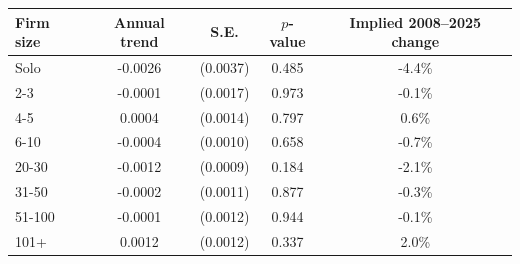 \begin{tabular}{lcccc}
\toprule
    Firm size & Annual trend & S.E. & $p$-value & Implied 2008--2025 change \\
    \midrule
Solo & -0.0026 & (0.0037) & 0.485 & -4.4\% \\
2-3 & -0.0001 & (0.0017) & 0.973 & -0.1\% \\
4-5 & 0.0004 & (0.0014) & 0.797 & 0.6\% \\
6-10 & -0.0004 & (0.0010) & 0.658 & -0.7\% \\
20-30 & -0.0012 & (0.0009) & 0.184 & -2.1\% \\
31-50 & -0.0002 & (0.0011) & 0.877 & -0.3\% \\
51-100 & -0.0001 & (0.0012) & 0.944 & -0.1\% \\
101+ & 0.0012 & (0.0012) & 0.337 & 2.0\%\\
\bottomrule\end{tabular}
